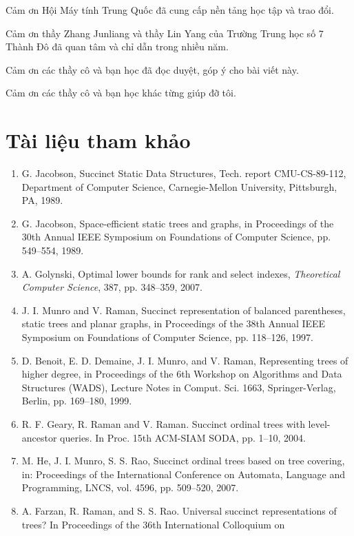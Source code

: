 \documentclass[11pt]{article}
\begin{document}
Cảm ơn Hội Máy tính Trung Quốc đã cung cấp nền tảng học tập và trao đổi.

Cảm ơn thầy Zhang Junliang và thầy Lin Yang của Trường Trung học số 7 Thành Đô
đã quan tâm và chỉ dẫn trong nhiều năm.

Cảm ơn các thầy cô và bạn học đã đọc duyệt, góp ý cho bài viết này.

Cảm ơn các thầy cô và bạn học khác từng giúp đỡ tôi.

\section*{Tài liệu tham khảo}

\begin{enumerate}
  \item G. Jacobson, Succinct Static Data Structures, Tech. report
        CMU-CS-89-112, Department of Computer Science, Carnegie-Mellon
        University, Pittsburgh, PA, 1989.
  \item G. Jacobson, Space-efficient static trees and graphs, in Proceedings
        of the 30th Annual IEEE Symposium on Foundations of Computer Science,
        pp. 549--554, 1989.
  \item A. Golynski, Optimal lower bounds for rank and select indexes,
        \emph{Theoretical Computer Science}, 387, pp. 348--359, 2007.
  \item J. I. Munro and V. Raman, Succinct representation of balanced
        parentheses, static trees and planar graphs, in Proceedings of the
        38th Annual IEEE Symposium on Foundations of Computer Science,
        pp. 118--126, 1997.
  \item D. Benoit, E. D. Demaine, J. I. Munro, and V. Raman, Representing
        trees of higher degree, in Proceedings of the 6th Workshop on
        Algorithms and Data Structures (WADS), Lecture Notes in Comput. Sci.
        1663, Springer-Verlag, Berlin, pp. 169--180, 1999.
  \item R. F. Geary, R. Raman and V. Raman. Succinct ordinal trees with
        level-ancestor queries. In Proc. 15th ACM-SIAM SODA, pp. 1--10, 2004.
  \item M. He, J. I. Munro, S. S. Rao, Succinct ordinal trees based on tree
        covering, in: Proceedings of the International Conference on Automata,
        Language and Programming, LNCS, vol. 4596, pp. 509--520, 2007.
  \item A. Farzan, R. Raman, and S. S. Rao. Universal succinct representations
        of trees? In Proceedings of the 36th International Colloquium on

\end{enumerate}
\end{document}
